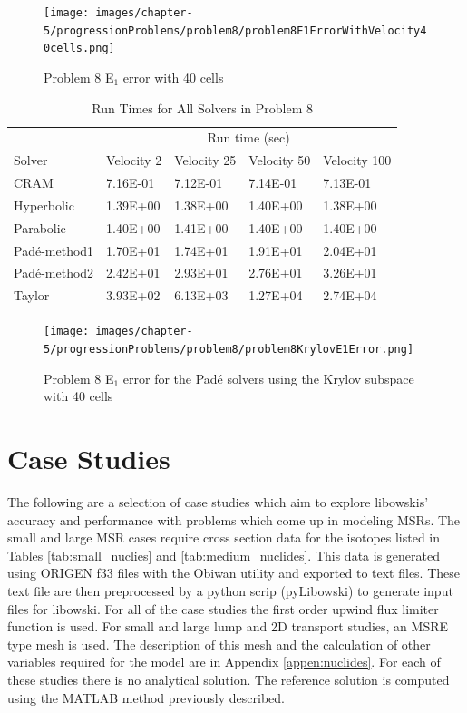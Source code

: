 \clearpage

\begin{figure}[p]
    \centering
    \texttt{[image: images/chapter-5/progressionProblems/problem8/problem8E1ErrorWithVelocity40cells.png]}
    \caption{Problem 8 E${}_{1}$ error with 40 cells}
    \label{fig:problem8_E1_error_40cells}
\end{figure}

\clearpage

\begin{table}[p]
   \caption{\label{tab:problem8_run_times} Run Times for All Solvers in Problem 8}
   \centering
   \begin{tabular}{lllll}
   \hline
    \multicolumn{1}{c}{} & \multicolumn{4}{c}{Run time (sec)}  \\
    Solver & Velocity 2 & Velocity 25 & Velocity 50 & Velocity 100 \\
   \hline
	CRAM & 7.16E-01 & 7.12E-01	& 7.14E-01 & 7.13E-01 \\
	Hyperbolic & 1.39E+00 & 1.38E+00	& 1.40E+00 & 1.38E+00 \\
	Parabolic & 1.40E+00 & 1.41E+00	& 1.40E+00 & 1.40E+00 \\
	Pad\'e-method1 & 1.70E+01 & 1.74E+01	& 1.91E+01 & 2.04E+01 \\
	Pad\'e-method2 & 2.42E+01 & 2.93E+01	& 2.76E+01 & 3.26E+01 \\
	Taylor & 3.93E+02 & 6.13E+03	& 1.27E+04 & 2.74E+04 \\
   \hline
   \end{tabular}
\end{table}  

\clearpage

\begin{figure}[p]
    \centering
    \texttt{[image: images/chapter-5/progressionProblems/problem8/problem8KrylovE1Error.png]}
    \caption{Problem 8 E${}_{1}$ error for the Pad\'e solvers using the Krylov subspace with 40 cells}
    \label{fig:problem8_E1_error_krylov}
\end{figure}

\clearpage

\section{Case Studies}
The following are a selection of case studies which aim to explore libowskis' accuracy and performance with problems which come up in modeling MSRs. The small and large MSR cases require cross section data for the isotopes listed in Tables \ref{tab:small_nuclies} and \ref{tab:medium_nuclides}. This data is generated using ORIGEN f33 files with the Obiwan utility and exported to text files. These text file are then preprocessed by a python scrip (pyLibowski) to generate input files for libowski. For all of the case studies the first order upwind flux limiter function is used. For small and large lump and 2D transport studies, an MSRE type mesh is used. The description of this mesh and the calculation of other variables required for the model are in Appendix \ref{appen:nuclides}. For each of these studies there is no analytical solution. The reference solution is computed using the MATLAB method previously described. 

